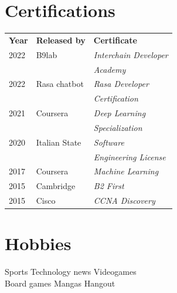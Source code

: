\documentclass[]{deedy-resume-openfont}
\begin{document}
\begin{minipage}[t]{0.33\textwidth}
\section{Certifications}
\begin{tabular}{@{}lll@{}}
\textbf{Year} & \textbf{Released by} & \textbf{Certificate} \\
2022          & B9lab         & \textit{Interchain Developer} \\
              &               & \textit{Academy} \\
2022          & Rasa chatbot  & \textit{Rasa Developer} \\
              &               & \textit{Certification} \\
2021          & Coursera      & \textit{Deep Learning} \\
              &               & \textit{Specialization} \\
2020          & Italian State & \textit{Software}\\
              &               & \textit{Engineering License} \\
2017          & Coursera      & \textit{Machine Learning} \\
2015	      & Cambridge     & \textit{B2 First} \\
2015	      & Cisco         & \textit{CCNA Discovery} \\
\end{tabular}
\sectionsep


\section{Hobbies}
Sports \textbullet{} Technology news \textbullet{} Videogames \\
Board games \textbullet{} Mangas \textbullet{} Hangout

%
%

\end{minipage}
\hfill
\end{document}
